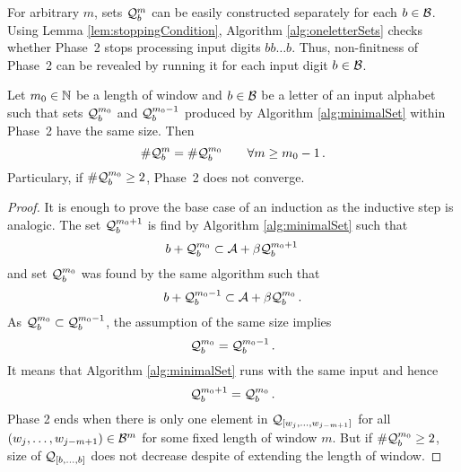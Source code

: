 For arbitrary $m$, sets $\mathcal{Q}^m_b$  can be easily constructed separately for each $b\in\mathcal{B}$. Using Lemma \ref{lem:stoppingCondition}, Algorithm \ref{alg:oneletterSets} checks whether Phase~2 stops processing input digits $bb\dots b$. Thus,  non-finitness of Phase~2 can be revealed by running it for each input digit $b\in\mathcal{B}$.
\begin{lem}
\label{lem:stoppingCondition}
Let $m_0 \in \mathbb{N}$ be a length of window and $b\in\mathcal{B}$ be a letter of an input alphabet such that sets $\mathcal{Q}^{m_0}_b$ and $\mathcal{Q}^{{m_0}-1}_b$ produced by Algorithm \ref{alg:minimalSet} within Phase~2 have the same size. Then
$$
    \#\mathcal{Q}^m_b = \#\mathcal{Q}^{m_0}_b \qquad \forall m\geq m_0-1\,.
$$ 
Particulary, if $\#\mathcal{Q}^{m_0}_b\geq 2$, Phase~2 does not converge.
\end{lem}
\begin{proof}
It is enough to prove the base case of an induction as the inductive step is analogic. The set $\mathcal{Q}^{m_0+1}_b$ is find by Algorithm \ref{alg:minimalSet} such that 
$$
b + \mathcal{Q}^{m_0}_b \subset \mathcal{A} + \beta \mathcal{Q}^{m_0+1}_b\,
$$
and set $\mathcal{Q}^{m_0}_b$ was found by the same algorithm such that
$$
b + \mathcal{Q}^{m_0-1}_b \subset \mathcal{A} + \beta \mathcal{Q}^{m_0}_b\,.
$$
As $\mathcal{Q}^{m_0}_b \subset \mathcal{Q}^{{m_0}-1}_b$, the assumption of the same size implies
$$
    \mathcal{Q}^{m_0}_b = \mathcal{Q}^{{m_0}-1}_b\,.
$$
It means that Algorithm \ref{alg:minimalSet} runs with the same input and hence
$$
\mathcal{Q}^{m_0+1}_b=\mathcal{Q}^{m_0}_b\,.
$$
Phase 2 ends when there is only one element in $\mathcal{Q}_{[w_j,\dots, w_{j-m+1}]}$ for all $(w_j,\dots, w_{j-m+1}) \in \mathcal{B}^m$ for some fixed length of window $m$. But if $\#\mathcal{Q}^{m_0}_b\geq 2$, size of $\mathcal{Q}_{[b,\dots,b]}$ does not decrease despite of extending the length of window.
\end{proof}



















